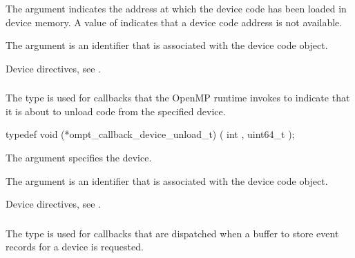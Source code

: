 The  argument indicates the address at which the device code has 
been loaded in device memory. A value of  indicates that a 
device code address is not available.

The  argument is an identifier that is associated with the device 
code object.

\begin{crossrefs}
\item Device directives, see .
\end{crossrefs}


\subsubsection{}
\label{sec:ompt_callback_device_unload_t}

\summary
The  type is used for callbacks that 
the OpenMP runtime invokes to indicate that it is about to unload code from
the specified device.

\format
\begin{ccppspecific}
\begin{omptCallback}
typedef void (*ompt_callback_device_unload_t) (
  int ,
  uint64_t 
);
\end{omptCallback}
\end{ccppspecific}

\argdesc
The  argument specifies the device.

The  argument is an identifier that is associated 
with the device code object.

\begin{crossrefs}
\item Device directives, see .
\end{crossrefs}



\subsubsection{}
\label{sec:ompt_callback_buffer_request_t}

\summary
The  type is used for callbacks that are
dispatched when a buffer to store event records for a device is requested.

